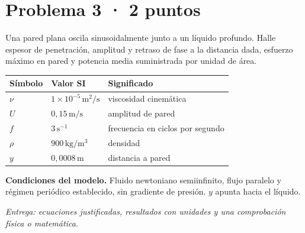 \par\medskip\noindent\begin{minipage}{\linewidth}

\section{Problema 3 · 2 puntos}

Una pared plana oscila sinusoidalmente junto a un líquido profundo. Halle espesor de penetración, amplitud y retraso de fase a la distancia dada, esfuerzo máximo en pared y potencia media suministrada por unidad de área.

\begin{tabular}{@{}p{.15\linewidth}p{.23\linewidth}p{.54\linewidth}@{}}
\toprule Símbolo & Valor SI & Significado\\\midrule
$\nu$ & $1\times10^{-5}\,\mathrm{m^2/s}$ & viscosidad cinemática\\
$U$ & $0{,}15\,\mathrm{m/s}$ & amplitud de pared\\
$f$ & $3\,\mathrm{s^{-1}}$ & frecuencia en ciclos por segundo\\
$\rho$ & $900\,\mathrm{kg/m^3}$ & densidad\\
$y$ & $0{,}0008\,\mathrm{m}$ & distancia a pared\\
\bottomrule\end{tabular}

\par\medskip\textbf{Condiciones del modelo.} Fluido newtoniano semiinfinito, flujo paralelo y régimen periódico establecido, sin gradiente de presión. $y$ apunta hacia el líquido.

\par\textit{Entrega: ecuaciones justificadas, resultados con unidades y una comprobación física o matemática.}

\end{minipage}\par\medskip

